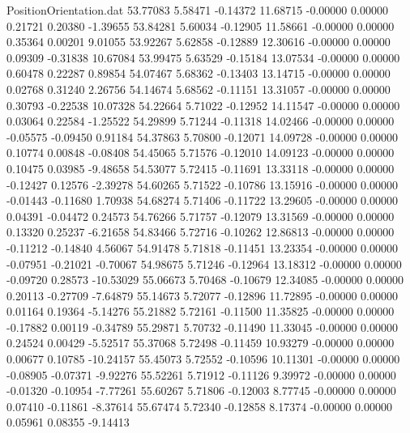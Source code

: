 \begin{filecontents}{PositionOrientation.dat}
  53.77083    5.58471   -0.14372    11.68715   -0.00000    0.00000    0.21721    0.20380   -1.39655
  53.84281    5.60034   -0.12905    11.58661   -0.00000    0.00000    0.35364    0.00201    9.01055
  53.92267    5.62858   -0.12889    12.30616   -0.00000    0.00000    0.09309   -0.31838   10.67084
  53.99475    5.63529   -0.15184    13.07534   -0.00000    0.00000    0.60478    0.22287    0.89854
  54.07467    5.68362   -0.13403    13.14715   -0.00000    0.00000    0.02768    0.31240    2.26756
  54.14674    5.68562   -0.11151    13.31057   -0.00000    0.00000    0.30793   -0.22538   10.07328
  54.22664    5.71022   -0.12952    14.11547   -0.00000    0.00000    0.03064    0.22584   -1.25522
  54.29899    5.71244   -0.11318    14.02466   -0.00000    0.00000   -0.05575   -0.09450    0.91184
  54.37863    5.70800   -0.12071    14.09728   -0.00000    0.00000    0.10774    0.00848   -0.08408
  54.45065    5.71576   -0.12010    14.09123   -0.00000    0.00000    0.10475    0.03985   -9.48658
  54.53077    5.72415   -0.11691    13.33118   -0.00000    0.00000   -0.12427    0.12576   -2.39278
  54.60265    5.71522   -0.10786    13.15916   -0.00000    0.00000   -0.01443   -0.11680    1.70938
  54.68274    5.71406   -0.11722    13.29605   -0.00000    0.00000    0.04391   -0.04472    0.24573
  54.76266    5.71757   -0.12079    13.31569   -0.00000    0.00000    0.13320    0.25237   -6.21658
  54.83466    5.72716   -0.10262    12.86813   -0.00000    0.00000   -0.11212   -0.14840    4.56067
  54.91478    5.71818   -0.11451    13.23354   -0.00000    0.00000   -0.07951   -0.21021   -0.70067
  54.98675    5.71246   -0.12964    13.18312   -0.00000    0.00000   -0.09720    0.28573  -10.53029
  55.06673    5.70468   -0.10679    12.34085   -0.00000    0.00000    0.20113   -0.27709   -7.64879
  55.14673    5.72077   -0.12896    11.72895   -0.00000    0.00000    0.01164    0.19364   -5.14276
  55.21882    5.72161   -0.11500    11.35825   -0.00000    0.00000   -0.17882    0.00119   -0.34789
  55.29871    5.70732   -0.11490    11.33045   -0.00000    0.00000    0.24524    0.00429   -5.52517
  55.37068    5.72498   -0.11459    10.93279   -0.00000    0.00000    0.00677    0.10785  -10.24157
  55.45073    5.72552   -0.10596    10.11301   -0.00000    0.00000   -0.08905   -0.07371   -9.92276
  55.52261    5.71912   -0.11126     9.39972   -0.00000    0.00000   -0.01320   -0.10954   -7.77261
  55.60267    5.71806   -0.12003     8.77745   -0.00000    0.00000    0.07410   -0.11861   -8.37614
  55.67474    5.72340   -0.12858     8.17374   -0.00000    0.00000    0.05961    0.08355   -9.14413

\end{filecontents}
